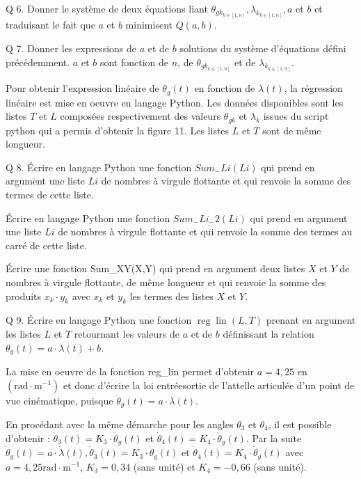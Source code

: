 \documentclass[10pt]{article}
\begin{document}
Q 6. Donner le système de deux équations liant $\theta_{g k_{k \in[1, n]}}, \lambda_{k_{k \in[1, n]}}, a$ et $b$ et traduisant le fait que $a$ et $b$ minimisent $Q(a, b)$.

Q 7. Donner les expressions de $a$ et de $b$ solutions du système d'équations défini précédemment. $a$ et $b$ sont fonction de $n$, de $\theta_{g k_{k \in[1, n]}}$ et de $\lambda_{k_{k \in[1, n]}}$.

Pour obtenir l'expression linéaire de $\theta_{g}(t)$ en fonction de $\lambda(t)$, la régression linéaire est mise en oeuvre en langage Python. Les données disponibles sont les listes $T$ et $L$ composées respectivement des valeurs $\theta_{g k}$ et $\lambda_{k}$ issues du script python qui a permis d'obtenir la figure 11. Les listes $L$ et $T$ sont de même longueur.

Q 8. Écrire en langage Python une fonction $S u m_{-} L i(L i)$ qui prend en argument une liste $L i$ de nombres à virgule flottante et qui renvoie la somme des termes de cette liste.

Écrire en langage Python une fonction $S u m_{-} L i_{-} 2(L i)$ qui prend en argument une liste $L i$ de nombres à virgule flottante et qui renvoie la somme des termes au carré de cette liste.

Écrire une fonction Sum\_XY(X,Y) qui prend en argument deux listes $X$ et $Y$ de nombres à virgule flottante, de même longueur et qui renvoie la somme des produits $x_{k} \cdot y_{k}$ avec $x_{k}$ et $y_{k}$ les termes des listes $X$ et $Y$.

Q 9. Écrire en langage Python une fonction $\operatorname{reg} \operatorname{lin}(L, T)$ prenant en argument les listes $L$ et $T$ retournant les valeurs de $a$ et de $b$ définissant la relation $\theta_{g}(t)=a \cdot \lambda(t)+b$.

La mise en oeuvre de la fonction reg\_lin permet d'obtenir $a=4,25$ en $\left(\mathrm{rad} \cdot \mathrm{m}^{-1}\right)$ et donc d'écrire la loi entréesortie de l'attelle articulée d'un point de vue cinématique, puisque $\dot{\theta}_{g}(t)=a \cdot \dot{\lambda}(t)$.

En procédant avec la même démarche pour les angles $\theta_{3}$ et $\theta_{4}$, il est possible d'obtenir : $\dot{\theta}_{3}(t)=K_{3} \cdot \dot{\theta}_{g}(t)$ et $\dot{\theta}_{4}(t)=K_{4} \cdot \dot{\theta}_{g}(t)$. Par la suite $\dot{\theta}_{g}(t)=a \cdot \dot{\lambda}(t), \dot{\theta}_{3}(t)=K_{3} \cdot \dot{\theta}_{g}(t)$ et $\dot{\theta}_{4}(t)=K_{4} \cdot \dot{\theta}_{g}(t)$ avec $a=4,25 \mathrm{rad} \cdot \mathrm{m}^{-1}$, $K_{3}=0,34$ (sans unité) et $K_{4}=-0,66$ (sans unité).
\end{document}

